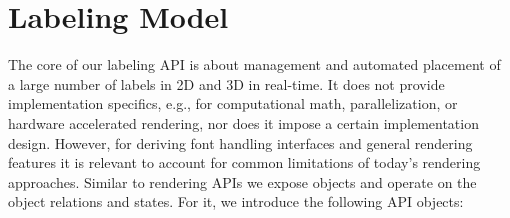 
\section{Labeling Model}
\label{sec:model}
\noindent
The core of our labeling API is about management and automated placement of a large number of labels in 2D and 3D in real-time.
It does not provide implementation specifics, e.g., for computational math, parallelization, or hardware accelerated rendering, nor does it impose a certain implementation design.
However, for deriving font handling interfaces and general rendering features it is relevant to account for common limitations of today's rendering approaches.
Similar to rendering APIs we expose objects and operate on the object relations and states.
For it, we introduce the following API objects:\medskip

